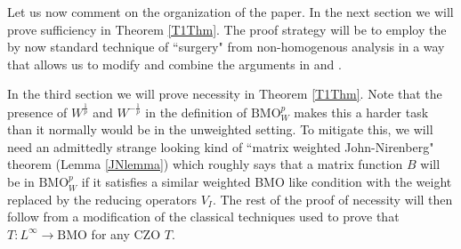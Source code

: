 \documentclass[12pt,reqno ]{amsart}
\numberwithin{equation}{section}
\theoremstyle{definition}
\newcommand{\BMOW}{\ensuremath{{\text{BMO}}_W ^p}}
\begin{document}




Let us now comment on the organization of the paper.  In the next section we will prove sufficiency in Theorem \ref{T1Thm}.  The proof strategy  will be to employ the by now standard technique of ``surgery" from non-homogenous analysis \footnotemark {} in a way that allows us to modify and combine the arguments in \cite{H} and \cite{NT}.

In the third section we will prove necessity in Theorem \ref{T1Thm}.  Note that the presence of $W^\frac{1}{p}$ and $W^{-\frac{1}{p}}$ in the definition of $\BMOW$ makes this a harder task than it normally would be in the unweighted setting.  To mitigate this, we will need an admittedly strange looking kind of ``matrix weighted John-Nirenberg" theorem (Lemma \ref{JNlemma}) which roughly says that a matrix function $B$ will be in $\BMOW$ if it satisfies a similar weighted BMO like condition with the weight replaced by the reducing operators $V_I$.  The rest of the proof of necessity will then follow from a modification of the classical techniques used to prove that $T : L^\infty \rightarrow \text{BMO}$ for any CZO $T$.
\end{document}
